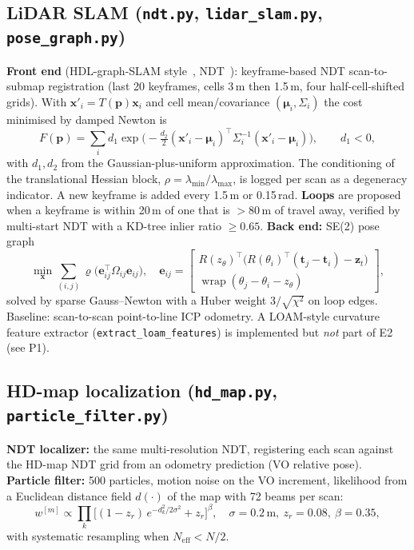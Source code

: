 \documentclass[11pt,a4paper]{article}
\begin{document}
\subsection{LiDAR SLAM (\texttt{ndt.py}, \texttt{lidar\_slam.py}, \texttt{pose\_graph.py})}
\textbf{Front end} (HDL-graph-SLAM style~\cite{koide19}, NDT~\cite{biber03}): keyframe-based NDT scan-to-submap registration (last 20 keyframes, cells 3\,m then 1.5\,m, four half-cell-shifted grids). With $\mathbf{x}'_i=T(\mathbf{p})\mathbf{x}_i$ and cell mean/covariance $(\boldsymbol\mu_i,\Sigma_i)$ the cost minimised by damped Newton is
\begin{equation}
F(\mathbf{p})=\sum_i d_1\exp\!\Big(-\tfrac{d_2}{2}(\mathbf{x}'_i-\boldsymbol\mu_i)^{\!\top}\Sigma_i^{-1}(\mathbf{x}'_i-\boldsymbol\mu_i)\Big),\qquad d_1<0 ,
\end{equation}
with $d_1,d_2$ from the Gaussian-plus-uniform approximation. The conditioning of the translational Hessian block, $\rho=\lambda_{\min}/\lambda_{\max}$, is logged per scan as a degeneracy indicator.
A new keyframe is added every 1.5\,m or 0.15\,rad. \textbf{Loops} are proposed when a keyframe is within 20\,m of one that is $>80$\,m of travel away, verified by multi-start NDT with a KD-tree inlier ratio $\ge0.65$. \textbf{Back end:} SE(2) pose graph
\begin{equation}
\min_{\mathbf{x}}\sum_{(i,j)}\varrho\big(\mathbf{e}_{ij}^{\top}\Omega_{ij}\mathbf{e}_{ij}\big),\quad
\mathbf{e}_{ij}=\begin{bmatrix}R(z_\theta)^{\!\top}\big(R(\theta_i)^{\!\top}(\mathbf{t}_j-\mathbf{t}_i)-\mathbf{z}_t\big)\\ \operatorname{wrap}(\theta_j-\theta_i-z_\theta)\end{bmatrix},
\end{equation}
solved by sparse Gauss--Newton with a Huber weight $3/\sqrt{\chi^2}$ on loop edges. Baseline: scan-to-scan point-to-line ICP odometry. A LOAM-style curvature feature extractor (\texttt{extract\_loam\_features}) is implemented but \emph{not} part of E2 (see P1).

\subsection{HD-map localization (\texttt{hd\_map.py}, \texttt{particle\_filter.py})}
\textbf{NDT localizer:} the same multi-resolution NDT, registering each scan against the HD-map NDT grid from an odometry prediction (VO relative pose). \textbf{Particle filter:} 500 particles, motion noise on the VO increment, likelihood from a Euclidean distance field $d(\cdot)$ of the map with 72 beams per scan:
\begin{equation}
w^{[m]}\propto\prod_{k}\Big[(1-z_r)\,e^{-d_k^{2}/2\sigma^{2}}+z_r\Big]^{\beta},\quad \sigma=0.2\,\text{m},\ z_r=0.08,\ \beta=0.35,
\end{equation}
with systematic resampling when $N_{\text{eff}}<N/2$.
\end{document}
